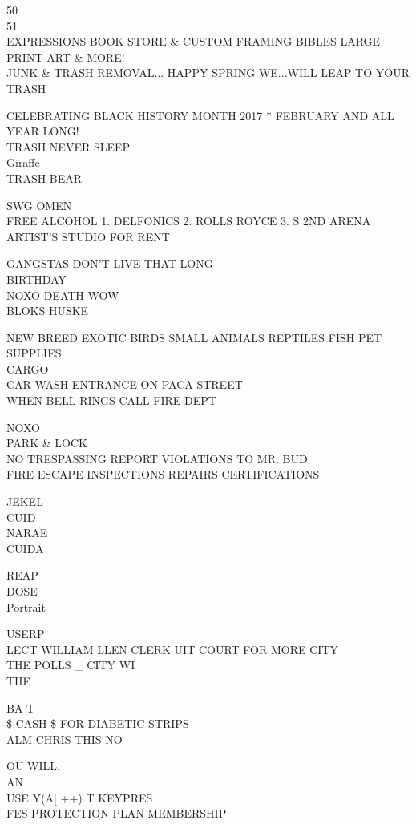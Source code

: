 \documentclass[10pt,letterpaper]{article}
\begin{document}
50\\
51\\
EXPRESSIONS BOOK STORE \& CUSTOM FRAMING BIBLES LARGE PRINT ART \& MORE!\\
JUNK \& TRASH REMOVAL... HAPPY SPRING WE...WILL LEAP TO YOUR TRASH

CELEBRATING BLACK HISTORY MONTH 2017 * FEBRUARY AND ALL YEAR LONG!\\
TRASH NEVER SLEEP\\
Giraffe\\
TRASH BEAR

SWG OMEN\\
FREE ALCOHOL 1. DELFONICS 2. ROLLS ROYCE 3. S 2ND ARENA\\
ARTIST'S STUDIO FOR RENT

GANGSTAS DON'T LIVE THAT LONG\\
BIRTHDAY\\
NOXO DEATH WOW\\
BLOKS HUSKE

NEW BREED EXOTIC BIRDS SMALL ANIMALS REPTILES FISH PET SUPPLIES\\
CARGO\\
CAR WASH ENTRANCE ON PACA STREET\\
WHEN BELL RINGS CALL FIRE DEPT

NOXO\\
PARK \& LOCK\\
NO TRESPASSING REPORT VIOLATIONS TO MR. BUD\\
FIRE ESCAPE INSPECTIONS REPAIRS CERTIFICATIONS

JEKEL\\
CUID\\
NARAE\\
CUIDA

REAP\\
DOSE\\
Portrait

USERP\\
LECT WILLIAM LLEN CLERK UIT COURT FOR MORE CITY\\
THE POLLS \_ CITY WI\\
THE

BA T\\
\$ CASH \$ FOR DIABETIC STRIPS\\
ALM CHRIS THIS NO

OU WILL.\\
AN\\
USE Y(A{[} ++) T KEYPRES\\
FES PROTECTION PLAN MEMBERSHIP
\end{document}
